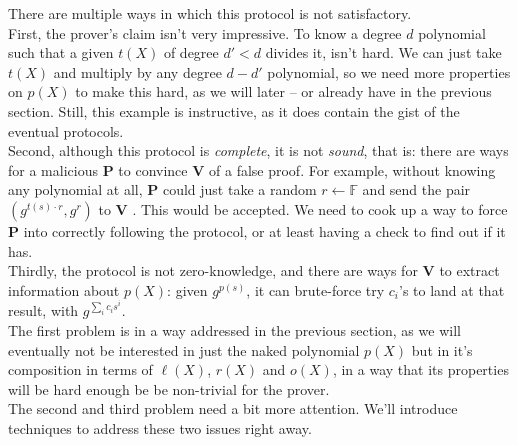 \documentclass[11pt,oneside]{article}
\newcommand{\bP}{\textbf{P} }
\newcommand{\bV}{\textbf{V} }
\theoremstyle{definition}
\theoremstyle{remark}
\numberwithin{equation}{section}
\begin{document}
There are multiple ways in which this protocol is not satisfactory.\\ 

First, the prover's claim isn't very impressive. To know a degree $d$ polynomial
such that a given $t(X)$ of degree $d'<d$ divides it, isn't hard. We can just
take $t(X)$ and multiply by any degree $d-d'$ polynomial, so we need more
properties on $p(X)$ to make this hard, as we will later -- or already have in
the previous section. Still, this example is instructive, as it does contain the
gist of the eventual protocols.\\ 

Second, although this protocol is \emph{complete}, it is not \emph{sound}, that
is: there are ways for a malicious \bP to convince \bV of a false proof. For
example, without knowing any polynomial at all, \bP could just take a random
$r\leftarrow \mathbb{F}$ and send the pair $(g^{t(s)\cdot r},g^r)$ to \bV. This
would be accepted. We need to cook up a way to force \bP into correctly
following the protocol, or at least having a check to find out if it has.\\

Thirdly, the protocol is not zero-knowledge, and there are ways for \bV to
extract information about $p(X)$: given $g^{p(s)}$, it can brute-force try
$c_i$'s to land at that result, with $g^{\sum_{i}c_is^i}$.\\ The first problem
is in a way addressed in the previous section, as we will eventually not be
interested in just the naked polynomial $p(X)$ but in it's composition in terms
of $\ell(X)$, $r(X)$ and $o(X)$, in a way that its properties will be hard
enough be be non-trivial for the prover.\\ The second and third problem need a
bit more attention. We'll introduce techniques to address these two issues right
away.
\newline
\end{document}
